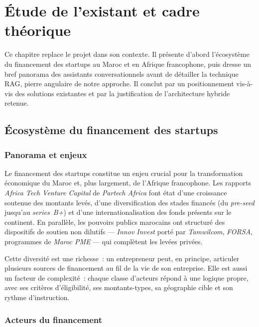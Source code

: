 \chapter{Étude de l'existant et cadre théorique}

Ce chapitre replace le projet dans son contexte. Il présente d'abord l'écosystème du financement des startups au Maroc et en Afrique francophone, puis dresse un bref panorama des assistants conversationnels avant de détailler la technique \ac{RAG}, pierre angulaire de notre approche. Il conclut par un positionnement vis-à-vis des solutions existantes et par la justification de l'architecture hybride retenue.

\section{Écosystème du financement des startups}

\subsection{Panorama et enjeux}

Le financement des startups constitue un enjeu crucial pour la transformation économique du Maroc et, plus largement, de l'Afrique francophone. Les rapports \textit{Africa Tech Venture Capital} de \textit{Partech Africa} font état d'une croissance soutenue des montants levés, d'une diversification des stades financés (du \textit{pre-seed} jusqu'au \textit{series~B+}) et d'une internationalisation des fonds présents sur le continent. En parallèle, les pouvoirs publics marocains ont structuré des dispositifs de soutien non dilutifs --- \textit{Innov Invest} porté par \textit{Tamwilcom}, \textit{FORSA}, programmes de \textit{Maroc PME} --- qui complètent les levées privées.

Cette diversité est une richesse~: un entrepreneur peut, en principe, articuler plusieurs sources de financement au fil de la vie de son entreprise. Elle est aussi un facteur de complexité~: chaque classe d'acteurs répond à une logique propre, avec ses critères d'éligibilité, ses montants-types, sa géographie cible et son rythme d'instruction.

\subsection{Acteurs du financement}

